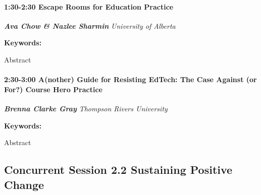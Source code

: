 \documentclass[
]{book}
\begin{document}
\begin{session}
\hypertarget{escape-rooms-for-education-practice}{%
\paragraph*{\texorpdfstring{1:30-2:30 \textbar{} \textbf{Escape Rooms
for Education} \textbar{}
Practice}{1:30-2:30 \textbar{} Escape Rooms for Education \textbar{} Practice}}\label{escape-rooms-for-education-practice}}

\textbf{\emph{Ava Chow \& Nazlee Sharmin}} \textbar{} \emph{University
of Alberta}

\textbf{Keywords:}

Abstract
\end{session}
\begin{session}
\hypertarget{another-guide-for-resisting-edtech-the-case-against-or-for-course-hero-practice}{%
\paragraph*{\texorpdfstring{2:30-3:00 \textbar{} \textbf{A(nother) Guide
for Resisting EdTech: The Case Against (or For?) Course Hero} \textbar{}
Practice}{2:30-3:00 \textbar{} A(nother) Guide for Resisting EdTech: The Case Against (or For?) Course Hero \textbar{} Practice}}\label{another-guide-for-resisting-edtech-the-case-against-or-for-course-hero-practice}}

\textbf{\emph{Brenna Clarke Gray}} \textbar{} \emph{Thompson Rivers
University}

\textbf{Keywords:}

Abstract
\end{session}

\hypertarget{concurrent-session-2.2-sustaining-positive-change}{%
\subsection*{Concurrent Session 2.2 \textbar{} Sustaining Positive Change}\label{concurrent-session-2.2-sustaining-positive-change}}
\end{document}

